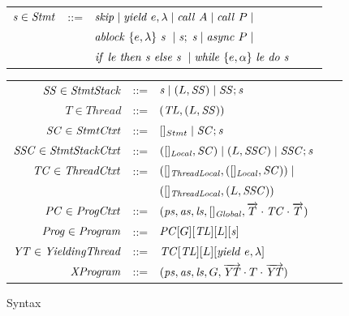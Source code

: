 \begin{figure}
\setlength{\tabcolsep}{3pt}
\begin{tabular}{rclcl}
$\mathit{s} \in \mathit{Stmt}$ &::= & $\mathit{skip} \mid \mathit{yield}\ e,\lambda \mid \mathit{call}\ A \mid \mathit{call}\ P \mid$ \\
                  & & $\mathit{ablock}\ {\{e,\lambda\}}\ {\mathit{s}}\  \mid \mathit{s};\;\mathit{s} \mid \mathit{async}\ P \mid$\\
                  & & ${\mathit{if}\ {\mathit{le}}\ }{\mathit{then}\ {\mathit{s}}\ }{\mathit{else}\ {\mathit{s}}\ } \mid \mathit{while}\ \{{e,\alpha}\}\ {{\mathit{le}}\ } \mathit{do}\ {{\mathit{s}}\ }$ \vspace{6pt} \\
\end{tabular}
\begin{tabular}{rclcl}
$\mathit{SS} \in \mathit{StmtStack}$ &::= & $\mathit{s} \mid (L,\mathit{SS}) \mid \mathit{SS};\mathit{s}$ \\
$T \in \mathit{Thread}$ &::= &$(\mathit{TL}, (L, \mathit{SS}))$ \\
$\mathit{SC} \in \mathit{StmtCtxt}$ &::= &$[]_{Stmt} \mid \mathit{SC};\mathit{s}$ \\
$\mathit{SSC} \in \mathit{StmtStackCtxt}$ &::= & $([]_{\mathit{Local}}, \mathit{SC}) \mid (L,\mathit{SSC}) \mid \mathit{SSC};\mathit{s}$ \\
$\mathit{TC} \in \mathit{ThreadCtxt}$ &::= &$([]_{\mathit{ThreadLocal}}, ([]_{\mathit{Local}}, \mathit{SC})) \mid$ \\
 & &$([]_{\mathit{ThreadLocal}}, (L, \mathit{SSC}))$ \\
$\mathit{PC} \in \mathit{ProgCtxt}$ &::= & $(\mathit{ps}, \mathit{as}, \mathit{ls}, []_{\mathit{Global}}, \overrightarrow{T} \cdot \mathit{TC} \cdot \overrightarrow{T})$ \\
$\mathit{Prog} \in \mathit{Program}$ &::= & $\mathit{PC}[G][\mathit{TL}][L][\mathit{s}]$ \vspace{6pt} \\
$\mathit{YT} \in \mathit{YieldingThread}$ &::= &$\mathit{TC}[\mathit{TL}][L][\mathit{yield}\ e,\lambda]$ \\
$\mathit{XProgram}$ &::= & $(\mathit{ps}, \mathit{as}, \mathit{ls}, G, \overrightarrow{\mathit{YT}} \cdot T \cdot \overrightarrow{\mathit{YT}})$
\end{tabular}
\caption{Syntax}
\label{fig:syntax}
\end{figure}

